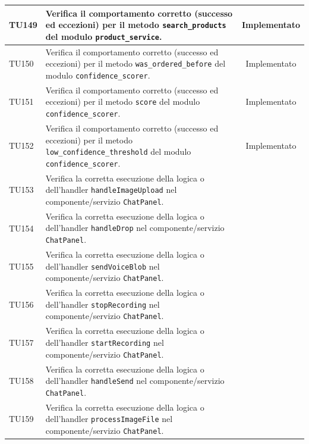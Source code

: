\documentclass[a4paper,11pt,oneside]{scrartcl}
\begin{document}
\begin{longtable}{|p{1.9cm}|p{11.6cm}|c|}
    TU149           & Verifica il comportamento corretto (successo ed eccezioni) per il metodo \texttt{search\_products} del modulo \texttt{product\_service}.                     & Implementato   \\ \hline
    TU150           & Verifica il comportamento corretto (successo ed eccezioni) per il metodo \texttt{was\_ordered\_before} del modulo \texttt{confidence\_scorer}.               & Implementato   \\ \hline
    TU151           & Verifica il comportamento corretto (successo ed eccezioni) per il metodo \texttt{score} del modulo \texttt{confidence\_scorer}.                              & Implementato   \\ \hline
    TU152           & Verifica il comportamento corretto (successo ed eccezioni) per il metodo \texttt{low\_confidence\_threshold} del modulo \texttt{confidence\_scorer}.         & Implementato   \\ \hline
    TU153           & Verifica la corretta esecuzione della logica o dell'handler \texttt{handleImageUpload} nel componente/servizio \texttt{ChatPanel}.                           &                \\ \hline
    TU154           & Verifica la corretta esecuzione della logica o dell'handler \texttt{handleDrop} nel componente/servizio \texttt{ChatPanel}.                                  &                \\ \hline
    TU155           & Verifica la corretta esecuzione della logica o dell'handler \texttt{sendVoiceBlob} nel componente/servizio \texttt{ChatPanel}.                               &                \\ \hline
    TU156           & Verifica la corretta esecuzione della logica o dell'handler \texttt{stopRecording} nel componente/servizio \texttt{ChatPanel}.                               &                \\ \hline
    TU157           & Verifica la corretta esecuzione della logica o dell'handler \texttt{startRecording} nel componente/servizio \texttt{ChatPanel}.                              &                \\ \hline
    TU158           & Verifica la corretta esecuzione della logica o dell'handler \texttt{handleSend} nel componente/servizio \texttt{ChatPanel}.                                  &                \\ \hline
    TU159           & Verifica la corretta esecuzione della logica o dell'handler \texttt{processImageFile} nel componente/servizio \texttt{ChatPanel}.                            &                \\ \hline

\end{longtable}
\end{document}
